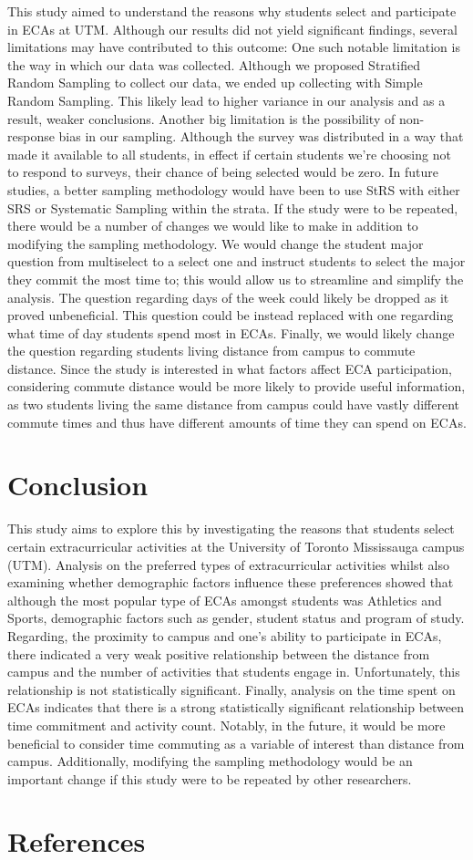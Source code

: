 \documentclass[
  letterpaper,
  DIV=11,
  numbers=noendperiod]{scrartcl}
\begin{document}
This study aimed to understand the reasons why students select and
participate in ECAs at UTM. Although our results did not yield
significant findings, several limitations may have contributed to this
outcome: One such notable limitation is the way in which our data was
collected. Although we proposed Stratified Random Sampling to collect
our data, we ended up collecting with Simple Random Sampling. This
likely lead to higher variance in our analysis and as a result, weaker
conclusions. Another big limitation is the possibility of non-response
bias in our sampling. Although the survey was distributed in a way that
made it available to all students, in effect if certain students we're
choosing not to respond to surveys, their chance of being selected would
be zero. In future studies, a better sampling methodology would have
been to use StRS with either SRS or Systematic Sampling within the
strata. If the study were to be repeated, there would be a number of
changes we would like to make in addition to modifying the sampling
methodology. We would change the student major question from multiselect
to a select one and instruct students to select the major they commit
the most time to; this would allow us to streamline and simplify the
analysis. The question regarding days of the week could likely be
dropped as it proved unbeneficial. This question could be instead
replaced with one regarding what time of day students spend most in
ECAs. Finally, we would likely change the question regarding students
living distance from campus to commute distance. Since the study is
interested in what factors affect ECA participation, considering commute
distance would be more likely to provide useful information, as two
students living the same distance from campus could have vastly
different commute times and thus have different amounts of time they can
spend on ECAs.

\section{Conclusion}\label{conclusion}

This study aims to explore this by investigating the reasons that
students select certain extracurricular activities at the University of
Toronto Mississauga campus (UTM). Analysis on the preferred types of
extracurricular activities whilst also examining whether demographic
factors influence these preferences showed that although the most
popular type of ECAs amongst students was Athletics and Sports,
demographic factors such as gender, student status and program of study.
Regarding, the proximity to campus and one's ability to participate in
ECAs, there indicated a very weak positive relationship between the
distance from campus and the number of activities that students engage
in. Unfortunately, this relationship is not statistically significant.
Finally, analysis on the time spent on ECAs indicates that there is a
strong statistically significant relationship between time commitment
and activity count. Notably, in the future, it would be more beneficial
to consider time commuting as a variable of interest than distance from
campus. Additionally, modifying the sampling methodology would be an
important change if this study were to be repeated by other researchers.

\newpage

\section{References}\label{references}
\end{document}
